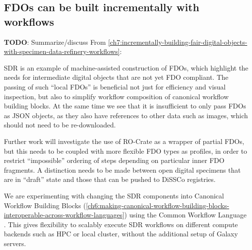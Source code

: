 \subsection{FDOs can be built incrementally with workflows}
\textbf{TODO}: Summarize/discuss 
From \vref{ch7:incrementally-building-fair-digital-objects-with-specimen-data-refinery-workflows}:


SDR is an example of machine-assisted construction of FDOs, which
highlight the needs for intermediate digital objects that are not yet
FDO compliant. The passing of such ``local FDOs'' is beneficial not just
for efficiency and visual inspection, but also to simplify workflow
composition of canonical workflow building blocks. At the same time we
see that it is insufficient to only pass FDOs as JSON objects, as they
also have references to other data such as images, which should not need
to be re-downloaded.

Further work will investigate the use of RO-Crate as a wrapper of
partial FDOs, but this needs to be coupled with more flexible FDO types
as profiles, in order to restrict ``impossible'' ordering of steps
depending on particular inner FDO fragments. A distinction needs to be
made between open digital specimens that are in ``draft'' state and
those that can be pushed to DiSSCo registries.

We are experimenting with changing the SDR components into Canonical
Workflow Building Blocks \cite{Soiland-Reyes 2022a}
(\vref{ch6:making-canonical-workflow-building-blocks-interoperable-across-workflow-languages}) 
using the Common Workflow Language \cite{Crusoe 2022}. This gives
flexibility to scalably execute SDR workflows on different compute
backends such as HPC or local cluster, without the additional setup of
Galaxy servers.

